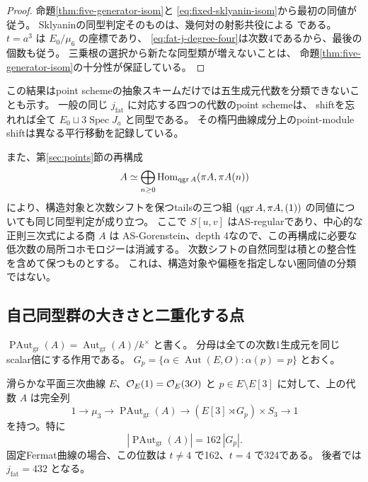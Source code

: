\begin{proof}
命題\ref{thm:five-generator-isom}と
\eqref{eq:fixed-sklyanin-isom}から最初の同値が従う。
Sklyaninの同型判定そのものは、幾何対の射影共役による
\cite[Theorem 2.8, Theorem 4.16]{IMRelations}である。
$t=a^3$ は $E_0/\mu_6$ の座標であり、
\eqref{eq:fat-j-degree-four}は次数4であるから、最後の個数も従う。
三乗根の選択から新たな同型類が増えないことは、
命題\ref{thm:five-generator-isom}の十分性が保証している。
\end{proof}

この結果はpoint schemeの抽象スキームだけでは五生成元代数を分類できないことも示す。
一般の同じ $j_{\mathrm{fat}}$ に対応する四つの代数のpoint schemeは、
shiftを忘れれば全て $E_0\sqcup3\operatorname{Spec}J_a$ と同型である。
その楕円曲線成分上のpoint-module shiftは異なる平行移動を記録している。

また、第\ref{sec:points}節の再構成
\[
 A\simeq\bigoplus_{n\ge0}
 \operatorname{Hom}_{\operatorname{qgr} A}(\pi A,\pi A(n))
\]
により、構造対象と次数シフトを保つtailsの三つ組
$(\operatorname{qgr} A,\pi A,(1))$ の同値についても同じ同型判定が成り立つ。
ここで $S[u,v]$ はAS-regularであり、中心的な正則三次式による商 $A$ は
AS-Gorenstein、depth 4なので、この再構成に必要な低次数の局所コホモロジーは消滅する。
次数シフトの自然同型は積との整合性を含めて保つものとする。
これは、構造対象や偏極を指定しない圏同値の分類ではない。

\subsection{自己同型群の大きさと二重化する点}

$\operatorname{PAut}_{\mathrm{gr}}(A)
=\operatorname{Aut}_{\mathrm{gr}}(A)/k^\times$ と書く。
分母は全ての次数1生成元を同じscalar倍にする作用である。
$G_p=\{\alpha\in\operatorname{Aut}(E,O):\alpha(p)=p\}$ とおく。

\begin{theorem}[射影的な次数付き自己同型群]\label{thm:graded-automorphisms}
滑らかな平面三次曲線 $E$、$\mathcal O_E(1)=\mathcal O_E(3O)$ と
$p\in E\setminus E[3]$ に対して、上の代数 $A$ は完全列
\[
 1\longrightarrow\mu_3
 \longrightarrow\operatorname{PAut}_{\mathrm{gr}}(A)
 \longrightarrow(E[3]\rtimes G_p)\times S_3
 \longrightarrow1
\]
を持つ。特に
\[
 |\operatorname{PAut}_{\mathrm{gr}}(A)|=162\,|G_p|.
\]
固定Fermat曲線の場合、この位数は $t\ne4$ で162、$t=4$ で324である。
後者では $j_{\mathrm{fat}}=432$ となる。
\end{theorem}

